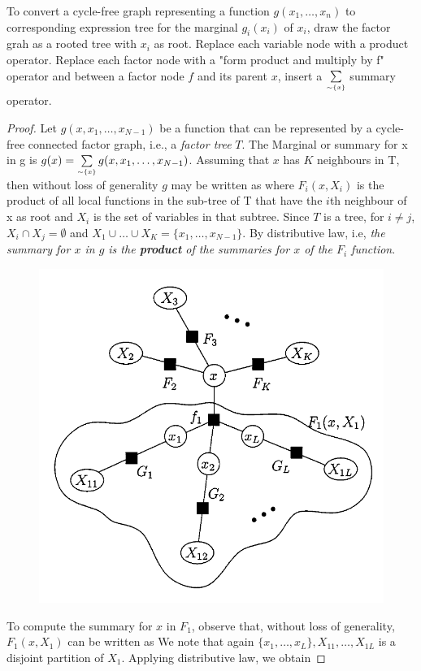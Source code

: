 \documentclass[letterpaper,english,10pt]{article}
\begin{document}
\begin{prop}
To convert a cycle-free graph representing a function $g(x_1,\dots,x_n)$ to corresponding expression tree for the marginal $g_i(x_i)$ of $x_i$,
draw the factor grah as a rooted tree with $x_i$ as root. Replace each variable node with a product operator. Replace each factor node with a
"form product and multiply by f" operator and between a factor node $f$ and its parent $x$, insert a $\sum\limits_{\mathsmaller{\sim\{x\}}}$ summary operator.
\end{prop}
\begin{proof}
Let $g(x,x_1,\dots,x_{N-1})$ be a function that can be represented by a cycle-free connected factor graph, \; i.e., \; a \textit{factor tree} $T$.
The Marginal or summary for x in g is $g(x) = \sum\limits_{\mathsmaller{\sim\{x\}}}g(x,x_1,\dots,x_{N-1})$.
Assuming that $x$ has $K$ neighbours in T, then without loss of generality $g$ may be written as 
where $F_i(x,X_i)$ is the product of all local functions in the sub-tree of T that have the $i$th neighbour of x as root and $X_i$ is the set of
variables in that subtree. Since $T$ is a tree, for $i \neq j$, $X_i \cap X_j = \emptyset$ and $X_1 \cup\dots \cup X_K = \{x_1,\dots,x_{N-1}\}$.
By distributive law,
i.e,\; \textit{the summary for $x$ in $g$ is the \textbf{product} of the summaries for $x$ of the $F_i$ function}.
\begin{figure}[htb]
\centering
\includegraphics[width=0.4\linewidth]{exmpl_6.png}
\end{figure}
\newline
To compute the summary for $x$ in $F_1$, observe that, without loss of generality, $F_1(x,X_1)$ can be written as
We note that again $\{x_1,\dots ,x_L\},X_{11},\dots,X_{1L}$ is a disjoint partition of $X_1$. Applying distributive law, we obtain


\end{proof}
\end{document}
